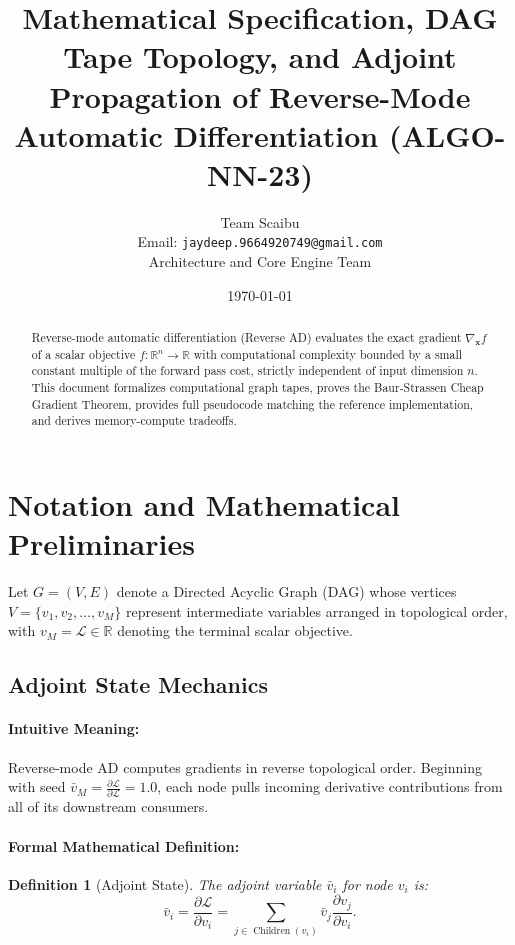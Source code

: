 \documentclass[11pt]{article}
\title{\textbf{Mathematical Specification, DAG Tape Topology, and Adjoint Propagation of Reverse-Mode Automatic Differentiation (ALGO-NN-23)}}
\author{Team Scaibu \\ \small Email: \texttt{jaydeep.9664920749@gmail.com} \\ \small Architecture and Core Engine Team}
\date{\today}
\newtheorem{definition}{Definition}
\begin{document}
\maketitle

\begin{abstract}
Reverse-mode automatic differentiation (Reverse AD) evaluates the exact gradient $\nabla_\mathbf{x} f$ of a scalar objective $f: \mathbb{R}^n \to \mathbb{R}$ with computational complexity bounded by a small constant multiple of the forward pass cost, strictly independent of input dimension $n$. This document formalizes computational graph tapes, proves the Baur-Strassen Cheap Gradient Theorem, provides full pseudocode matching the reference implementation, and derives memory-compute tradeoffs.
\end{abstract}

\section{Notation and Mathematical Preliminaries}
\label{sec:notation}

Let $G = (V, E)$ denote a Directed Acyclic Graph (DAG) whose vertices $V = \{v_1, v_2, \dots, v_M\}$ represent intermediate variables arranged in topological order, with $v_M = \mathcal{L} \in \mathbb{R}$ denoting the terminal scalar objective.

\subsection{Adjoint State Mechanics}
\paragraph{Intuitive Meaning:} Reverse-mode AD computes gradients in reverse topological order. Beginning with seed $\bar{v}_M = \frac{\partial \mathcal{L}}{\partial \mathcal{L}} = 1.0$, each node pulls incoming derivative contributions from all of its downstream consumers.

\paragraph{Formal Mathematical Definition:}
\begin{definition}[Adjoint State]
The adjoint variable $\bar{v}_i$ for node $v_i$ is:
\begin{equation}
\label{eq:adjoint_def}
\bar{v}_i = \frac{\partial \mathcal{L}}{\partial v_i} = \sum_{j \in \operatorname{Children}(v_i)} \bar{v}_j \frac{\partial v_j}{\partial v_i}.
\end{equation}
\end{definition}
\end{document}

